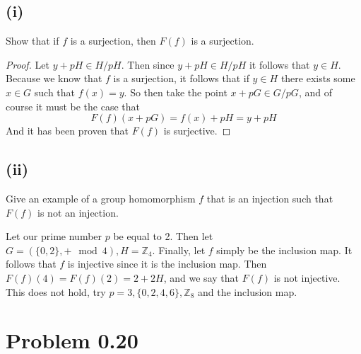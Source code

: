\documentclass{article}
\theoremstyle{definition}
\begin{document}
    \subsection*{(i)}
        \begin{mdframed}[]
            Show that if $f$ is a surjection, then $F(f)$ is a surjection.
        \end{mdframed}
        \begin{proof}
            Let $y + pH \in H / pH$. Then since $y + pH \in H / pH$ it follows that $y \in H$.
            Because we know that $f$ is a surjection, it follows that if $y \in H$ there exists some $x \in G$ 
            such that $f(x) = y$. So then take the point $x + pG \in G / pG$, and of course it must be the case that 
            \[
                F(f)(x + pG) = f(x) + pH = y + pH
            \]
            And it has been proven that $F(f)$ is surjective.
        \end{proof}
    \subsection*{(ii)}
        \begin{mdframed}[]
            Give an example of a group homomorphism $f$ that is an injection such that $F(f)$ is not an injection.
        \end{mdframed}
        Let our prime number $p$ be equal to 2. Then let $G = (\{0,2\}, + \mod{4}), H = \mathbb{Z}_4$. Finally, let $f$ simply be the inclusion map. It follows that 
        $f$ is injective since it is the inclusion map. Then $F(f)(4) = F(f)(2) = 2 + 2H$, and we say that $F(f)$ is not injective. This does not hold, 
        try $p = 3, \{0,2,4,6\}, \mathbb{Z}_8$ and the inclusion map.
\section{Problem 0.20}
\end{document}
